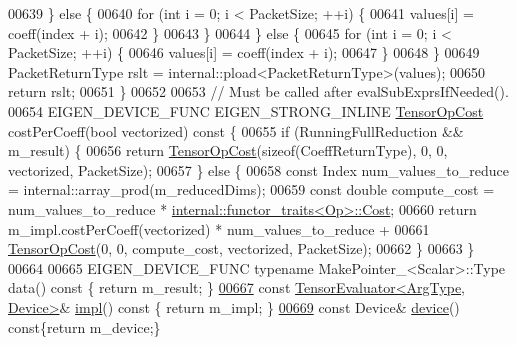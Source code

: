 \begin{DoxyCode}
00639       \} \textcolor{keywordflow}{else} \{
00640         \textcolor{keywordflow}{for} (\textcolor{keywordtype}{int} i = 0; i < PacketSize; ++i) \{
00641           values[i] = coeff(index + i);
00642         \}
00643       \}
00644     \} \textcolor{keywordflow}{else} \{
00645       \textcolor{keywordflow}{for} (\textcolor{keywordtype}{int} i = 0; i < PacketSize; ++i) \{
00646         values[i] = coeff(index + i);
00647       \}
00648     \}
00649     PacketReturnType rslt = internal::pload<PacketReturnType>(values);
00650     \textcolor{keywordflow}{return} rslt;
00651   \}
00652 
00653   \textcolor{comment}{// Must be called after evalSubExprsIfNeeded().}
00654   EIGEN\_DEVICE\_FUNC EIGEN\_STRONG\_INLINE \hyperlink{class_eigen_1_1_tensor_op_cost}{TensorOpCost} costPerCoeff(\textcolor{keywordtype}{bool} vectorized)\textcolor{keyword}{ const }\{
00655     \textcolor{keywordflow}{if} (RunningFullReduction && m\_result) \{
00656       \textcolor{keywordflow}{return} \hyperlink{class_eigen_1_1_tensor_op_cost}{TensorOpCost}(\textcolor{keyword}{sizeof}(CoeffReturnType), 0, 0, vectorized, PacketSize);
00657     \} \textcolor{keywordflow}{else} \{
00658       \textcolor{keyword}{const} Index num\_values\_to\_reduce = internal::array\_prod(m\_reducedDims);
00659       \textcolor{keyword}{const} \textcolor{keywordtype}{double} compute\_cost = num\_values\_to\_reduce * 
      \hyperlink{struct_eigen_1_1internal_1_1functor__traits}{internal::functor\_traits<Op>::Cost};
00660       \textcolor{keywordflow}{return} m\_impl.costPerCoeff(vectorized) * num\_values\_to\_reduce +
00661           \hyperlink{class_eigen_1_1_tensor_op_cost}{TensorOpCost}(0, 0, compute\_cost, vectorized, PacketSize);
00662     \}
00663   \}
00664 
00665   EIGEN\_DEVICE\_FUNC \textcolor{keyword}{typename} MakePointer\_<Scalar>::Type data()\textcolor{keyword}{ const }\{ \textcolor{keywordflow}{return} m\_result; \}
\hyperlink{struct_eigen_1_1_tensor_evaluator_3_01const_01_tensor_reduction_op_3_01_op_00_01_dims_00_01_arg_4fdf2ec1445de4704eb590bc98040dc6_a022a83b1c7a0ae214bb767317a5f11f3}{00667}   \textcolor{keyword}{const} \hyperlink{struct_eigen_1_1_tensor_evaluator}{TensorEvaluator<ArgType, Device>}& \hyperlink{struct_eigen_1_1_tensor_evaluator_3_01const_01_tensor_reduction_op_3_01_op_00_01_dims_00_01_arg_4fdf2ec1445de4704eb590bc98040dc6_a022a83b1c7a0ae214bb767317a5f11f3}{impl}()\textcolor{keyword}{ const }\{ \textcolor{keywordflow}{return} m\_impl;
       \}
\hyperlink{struct_eigen_1_1_tensor_evaluator_3_01const_01_tensor_reduction_op_3_01_op_00_01_dims_00_01_arg_4fdf2ec1445de4704eb590bc98040dc6_a2bada0128bde434694b50ebdce17366c}{00669}   \textcolor{keyword}{const} Device& \hyperlink{struct_eigen_1_1_tensor_evaluator_3_01const_01_tensor_reduction_op_3_01_op_00_01_dims_00_01_arg_4fdf2ec1445de4704eb590bc98040dc6_a2bada0128bde434694b50ebdce17366c}{device}()\textcolor{keyword}{ const}\{\textcolor{keywordflow}{return} m\_device;\}

\end{DoxyCode}
